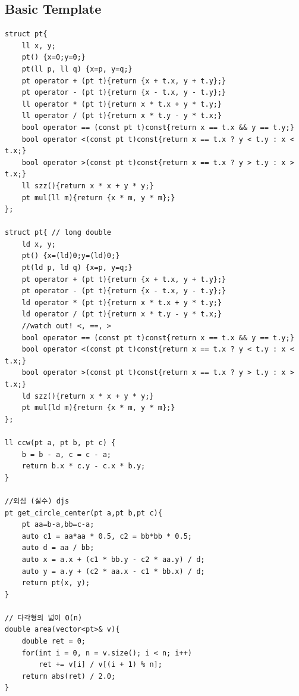 \documentclass[landscape, 8pt, a4paper, oneside, twocolumn]{extarticle}
\begin{document}
\subsection{Basic Template}
\begin{verbatim}
struct pt{    
    ll x, y;
    pt() {x=0;y=0;}
    pt(ll p, ll q) {x=p, y=q;}
    pt operator + (pt t){return {x + t.x, y + t.y};}
    pt operator - (pt t){return {x - t.x, y - t.y};}
    ll operator * (pt t){return x * t.x + y * t.y;}
    ll operator / (pt t){return x * t.y - y * t.x;}
    bool operator == (const pt t)const{return x == t.x && y == t.y;}
    bool operator <(const pt t)const{return x == t.x ? y < t.y : x < t.x;}
    bool operator >(const pt t)const{return x == t.x ? y > t.y : x > t.x;}
    ll szz(){return x * x + y * y;}    
    pt mul(ll m){return {x * m, y * m};}
};

struct pt{ // long double
    ld x, y;
    pt() {x=(ld)0;y=(ld)0;}
    pt(ld p, ld q) {x=p, y=q;}
    pt operator + (pt t){return {x + t.x, y + t.y};}
    pt operator - (pt t){return {x - t.x, y - t.y};}
    ld operator * (pt t){return x * t.x + y * t.y;}
    ld operator / (pt t){return x * t.y - y * t.x;}
    //watch out! <, ==, >
    bool operator == (const pt t)const{return x == t.x && y == t.y;}
    bool operator <(const pt t)const{return x == t.x ? y < t.y : x < t.x;}
    bool operator >(const pt t)const{return x == t.x ? y > t.y : x > t.x;}
    ld szz(){return x * x + y * y;}    
    pt mul(ld m){return {x * m, y * m};}
};

ll ccw(pt a, pt b, pt c) {
    b = b - a, c = c - a;
    return b.x * c.y - c.x * b.y;
}

//외심 (실수) djs
pt get_circle_center(pt a,pt b,pt c){
	pt aa=b-a,bb=c-a;
	auto c1 = aa*aa * 0.5, c2 = bb*bb * 0.5;
    auto d = aa / bb;
    auto x = a.x + (c1 * bb.y - c2 * aa.y) / d;
    auto y = a.y + (c2 * aa.x - c1 * bb.x) / d;
    return pt(x, y);
}

// 다각형의 넓이 O(n)
double area(vector<pt>& v){
    double ret = 0;
    for(int i = 0, n = v.size(); i < n; i++)
        ret += v[i] / v[(i + 1) % n];
    return abs(ret) / 2.0;
}

\end{verbatim}
\end{document}
